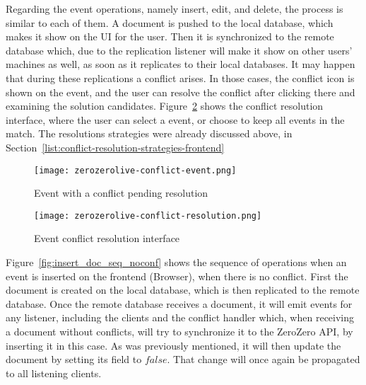 Regarding the event operations, namely insert, edit, and delete, the process is similar to each of them. A document is pushed to the local database, which makes it show on the UI for the user. Then it is synchronized to the remote database which, due to the replication listener will make it show on other users' machines as well, as soon as it replicates to their local databases. It may happen that during these replications a conflict arises. In those cases, the conflict icon is shown on the event, and the user can resolve the conflict after clicking there and examining the solution candidates. Figure~\ref{fig:zerozerolive-conflict-resolution} shows the conflict resolution interface, where the user can select a  event, or choose to keep all events in the match. The resolutions strategies were already discussed above, in Section~\ref{list:conflict-resolution-strategies-frontend}

\begin{figure}[h]
    \begin{center}
        \leavevmode
        \texttt{[image: zerozerolive-conflict-event.png]}
        \caption{Event with a conflict pending resolution}
        \label{fig:zerozerolive-conflict-event}
    \end{center}
\end{figure}

\begin{figure}[h]
    \begin{center}
        \leavevmode
        \texttt{[image: zerozerolive-conflict-resolution.png]}
        \caption{Event conflict resolution interface}
        \label{fig:zerozerolive-conflict-resolution}
    \end{center}
\end{figure}

Figure~\ref{fig:insert_doc_seq_noconf} shows the sequence of operations when an event is inserted on the frontend (Browser), when there is no conflict. First the document is created on the local database, which is then replicated to the remote database. Once the remote database receives a document, it will emit events for any listener, including the clients and the conflict handler which, when receiving a document without conflicts, will try to synchronize it to the ZeroZero API, by inserting it in this case. As was previously mentioned, it will then update the document by setting its  field to $false$. That change will once again be propagated to all listening clients.

